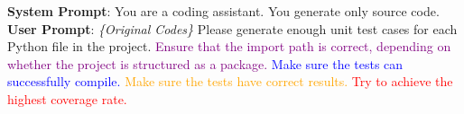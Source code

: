 \begin{prompt}
\scriptsize{
\textbf{System Prompt}: You are a coding assistant. You generate only source code. \\
\textbf{User Prompt}: \textit{\{Original Codes\}} Please generate enough unit test cases for each Python file in the project. \textcolor{purple}{Ensure that the import path is correct, depending on whether the project is structured as a package.} \textcolor{blue}{Make sure the tests can successfully compile.} \textcolor{orange}{Make sure the tests have correct results.} \textcolor{red}{Try to achieve the highest coverage rate.} 
}
\end{prompt}